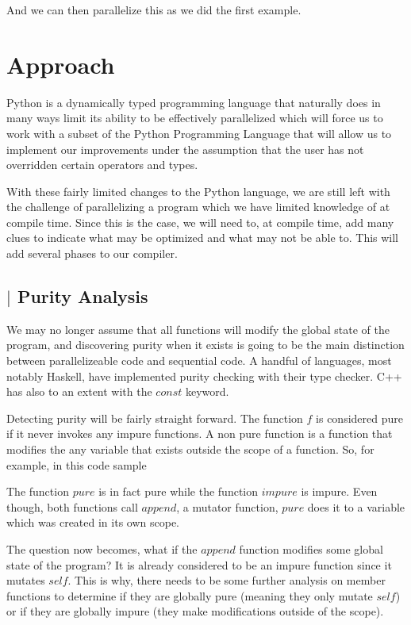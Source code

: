 \documentclass{article}
\begin{document}
\begin{multicols}{2}

And we can then parallelize this as we did the first example.

\section*{Approach}

Python is a dynamically typed programming language that naturally does in many
ways limit its ability to be effectively parallelized which will force us to
work with a subset of the Python Programming Language that will allow us to
implement our improvements under the assumption that the user has not
overridden certain operators and types.

With these fairly limited changes to the Python language, we are still left with
the challenge of parallelizing a program which we have limited knowledge of at compile time.
Since this is the case, we will need to, at compile time, add many clues to indicate what
may be optimized and what may not be able to. This will add several phases to our compiler.

\subsection*{$\vert$ Purity Analysis}

We may no longer assume that all functions will modify the global state of the program,
and discovering purity when it exists is going to be the main distinction between parallelizeable
code and sequential code. A handful of languages, most notably Haskell, have implemented
purity checking with their type checker. C++ has also to an extent with the $const$ keyword.

Detecting purity will be fairly straight forward. The function $f$ is considered pure if
it never invokes any impure functions. A non pure function is a function that modifies
the any variable that exists outside the scope of a function. So, for example, in this code
sample



The function $pure$ is in fact pure while the function $impure$ is impure. Even though,
both functions call $append$, a mutator function, $pure$ does it to a variable which
was created in its own scope.

The question now becomes, what if the $append$ function modifies some global state of the
program? It is already considered to be an impure function since it mutates $self$. This
is why, there needs to be some further analysis on member functions to determine if they are
globally pure (meaning they only mutate $self$) or if they are globally impure (they make
modifications outside of the scope).


\end{multicols}
\end{document}
